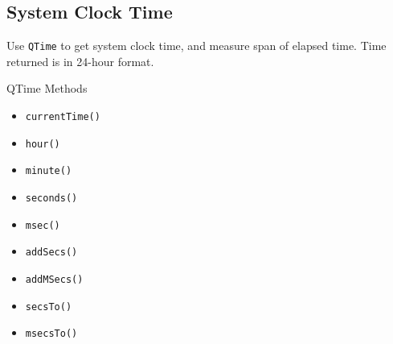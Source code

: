 \documentclass[notes.tex]{subfiles}
\begin{document}
			\subsection{System Clock Time}
				Use \verb|QTime| to get system clock time, and measure span of elapsed time. Time returned is in 24-hour format.
				\begin{sidenote}{QTime Methods}
					\vspace{-0.5cm}
					\begin{multicols}{2}
						\begin{itemize}[nosep]
							\item \verb|currentTime()|
							\item \verb|hour()|
							\item \verb|minute()|
							\item \verb|seconds()|
							\item \verb|msec()|
							\item \verb|addSecs()|
							\item \verb|addMSecs()|
							\item \verb|secsTo()|
							\item \verb|msecsTo()|
						\end{itemize}
					\end{multicols}
				\end{sidenote}
\end{document}
